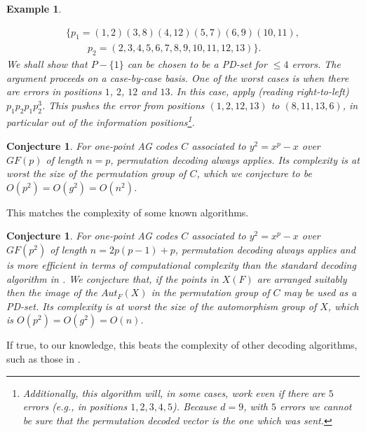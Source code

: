 \documentclass[12pt]{article}
\newtheorem{conjecture}[theorem]{Conjecture}
\newtheorem{example}[theorem]{Example}
\numberwithin{equation}{section}
\begin{document}
\begin{example}
\begin{enumerate}
\[
\begin{array}{c}
\{p_1=(1, 2)(3, 8)(4, 12)(5, 7)(6, 9)(10, 11),\\
\ \ \ \ \ \ \ \ \ \ p_2=(2, 3, 4, 5, 6, 7, 8, 9, 10, 11, 12, 13)\}.
\end{array}
\]
We shall show that $P-\{1\}$ can be chosen to be
a PD-set for $\leq 4$ errors. The argument proceeds on a case-by-case basis.
One of the worst cases is when there are {\it errors 
in positions $1$, $2$, $12$ and $13$}. In this case, apply
(reading right-to-left) $p_1p_2p_1p_2^3$. This pushes the 
error from positions $(1,2,12,13)$ to $(8,11,13,6)$,
in particular out of the information positions\footnote{Additionally, 
this algorithm will, in {\it some}
cases, work even if there are $5$ errors (e.g., in positions $1,2,3,4,5$).
Because $d=9$, with $5$ errors we cannot be sure that the 
permutation decoded vector is the one which was sent.}.
\end{enumerate}

\end{example}

\begin{conjecture} For one-point AG codes $C$ associated
to $y^2=x^p-x$ over $GF(p)$ of length $n=p$,
permutation decoding always applies.
Its complexity is
at worst the size of the permutation group of $C$, 
which we conjecture to be $O(p^2)=O(g^2)=O(n^2)$.
\end{conjecture}

This matches the complexity of some known algorithms.

\begin{conjecture}
For one-point AG codes $C$ associated
to $y^2=x^p-x$ over $GF(p^2)$ of length $n=2p(p-1)+p$,
permutation decoding always applies and is more efficient
in terms of computational complexity than the standard
decoding algorithm in \cite{Sti}. We conjecture that, if the points
in $X(F)$ are arranged suitably then the image of the
$Aut_F(X)$ in the permutation group of $C$ may be used
as a PD-set. Its complexity is
at worst the size of the automorphism group of $X$, 
which is $O(p^2)=O(g^2)=O(n)$.
\end{conjecture}

If true, to our knowledge, this beats the complexity of other
decoding algorithms, such as those in \cite{Sti}.
\end{document}
